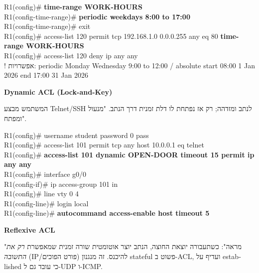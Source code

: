 \documentclass[11pt]{article}
\newcommand{\enLR}[1]{\textenglish{#1}}
\newcommand{\code}[1]{\textenglish{\codefont #1}}
\newcommand{\subheading}[1]{\vskip6pt{\bfseries\color{h3}#1\par}\vskip2pt}
\begin{document}
\begin{codebox}\begin{english}\codefont\footnotesize\color{cfg}\setlength{\parindent}{0pt}
R1(config)\# \textcolor{cbold}{\textbf{time-range WORK-HOURS}}\\
R1(config-time-range)\# \textcolor{cbold}{\textbf{periodic weekdays 8:00 to 17:00}}\\
R1(config-time-range)\# exit\\
R1(config)\# access-list 120 permit tcp 192.168.1.0 0.0.0.255 any eq 80 \textcolor{cbold}{\textbf{time-range WORK-HOURS}}\\
R1(config)\# access-list 120 deny ip any any\\
\textcolor{ccom}{\texthebrew{! אפשרויות: \enLR{periodic Monday Wednesday 9:00 to 12:00 / absolute start 08:00 1 Jan 2026 end 17:00 31 Jan 2026}}}
\end{english}\end{codebox}

\subheading{\enLR{Dynamic ACL (Lock-and-Key)}}

המשתמש מבצע \enLR{Telnet/SSH} לנתב ומזדהה; רק אז נפתחת לו דלת זמנית דרך הנתב. "מנעול ומפתח".\par

\begin{codebox}\begin{english}\codefont\footnotesize\color{cfg}\setlength{\parindent}{0pt}
R1(config)\# username student password 0 pass\\
R1(config)\# access-list 101 permit tcp any host 10.0.0.1 eq telnet\\
R1(config)\# \textcolor{cbold}{\textbf{access-list 101 dynamic OPEN-DOOR timeout 15 permit ip any any}}\\
R1(config)\# interface g0/0\\
R1(config-if)\# ip access-group 101 in\\
R1(config)\# line vty 0 4\\
R1(config-line)\# login local\\
R1(config-line)\# \textcolor{cbold}{\textbf{autocommand access-enable host timeout 5}}
\end{english}\end{codebox}

\subheading{\enLR{Reflexive ACL}}

"מראה": כשתעבורה יוצאת החוצה, הנתב יוצר אוטומטית שורה זמנית שמאפשרת \emph{רק את התשובה} \enLR{(IP}/פורט הפוכים) להיכנס. זה מנגנון \enLR{stateful} פשוט ב-\enLR{ACL}, ועדיף על \code{established} כי עובד גם ל-\enLR{UDP} ו-\enLR{ICMP.}\par
\end{document}
